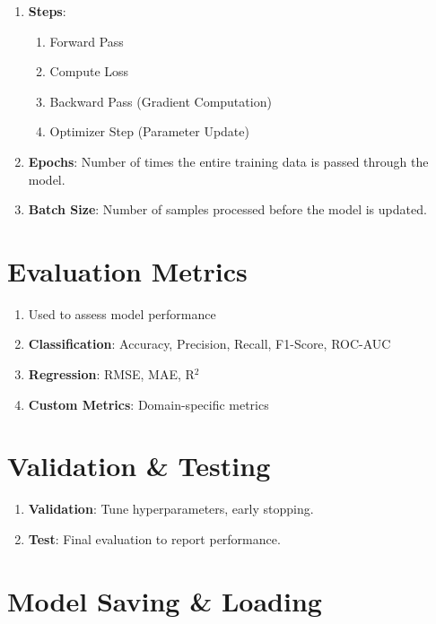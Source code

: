 \begin{enumerate}
    \item \textbf{Steps}:
    \begin{enumerate}
        \item Forward Pass
        \item Compute Loss
        \item Backward Pass (Gradient Computation)
        \item Optimizer Step (Parameter Update)
    \end{enumerate}
    
    \item \textbf{Epochs}: Number of times the entire training data is passed through the model.
    
    \item \textbf{Batch Size}: Number of samples processed before the model is updated.
\end{enumerate}
    



\section{Evaluation Metrics}

\begin{enumerate}
    \item Used to assess model performance
    \item \textbf{Classification}: Accuracy, Precision, Recall, F1-Score, ROC-AUC
    \item \textbf{Regression}: RMSE, MAE, R$^2$
    \item \textbf{Custom Metrics}: Domain-specific metrics
\end{enumerate}



\section{Validation \& Testing}

\begin{enumerate}
    \item \textbf{Validation}: Tune hyperparameters, early stopping.
    \item \textbf{Test}: Final evaluation to report performance.
\end{enumerate}



\section{Model Saving \& Loading}

